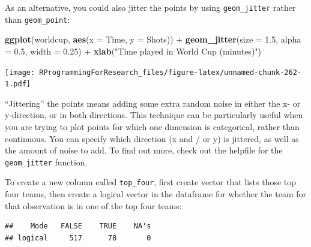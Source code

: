 \documentclass[]{book}
\makeatletter
\newenvironment{Shaded}{\begin{snugshade}}{\end{snugshade}}
\newcommand{\KeywordTok}[1]{\textcolor[rgb]{0.13,0.29,0.53}{\textbf{{#1}}}}
\newcommand{\DataTypeTok}[1]{\textcolor[rgb]{0.13,0.29,0.53}{{#1}}}
\newcommand{\FloatTok}[1]{\textcolor[rgb]{0.00,0.00,0.81}{{#1}}}
\newcommand{\StringTok}[1]{\textcolor[rgb]{0.31,0.60,0.02}{{#1}}}
\newcommand{\NormalTok}[1]{{#1}}
\newenvironment{kframe}{%
\medskip{}
\setlength{\fboxsep}{.8em}
 \def\at@end@of@kframe{}%
 \ifinner\ifhmode%
  \def\at@end@of@kframe{\end{minipage}}%
  \begin{minipage}{\columnwidth}%
 \fi\fi%
 \def\FrameCommand##1{\hskip\@totalleftmargin \hskip-\fboxsep
 \colorbox{shadecolor}{##1}\hskip-\fboxsep
     \hskip-\linewidth \hskip-\@totalleftmargin \hskip\columnwidth}%
 \MakeFramed {\advance\hsize-\width
   \@totalleftmargin\z@ \linewidth\hsize
   \@setminipage}}%
 {\par\unskip\endMakeFramed%
 \at@end@of@kframe}
\renewenvironment{Shaded}{\begin{kframe}}{\end{kframe}}
\newenvironment{rmdblock}[1]
  {
  \begin{itemize}
  \renewcommand{\labelitemi}{
    \raisebox{-.7\height}[0pt][0pt]{
      {\setkeys{Gin}{width=3em,keepaspectratio}\texttt{[image: images/\#1]}}
    }
  }
  \setlength{\fboxsep}{1em}
  \begin{kframe}
  \item
  }
  {
  \end{kframe}
  \end{itemize}
  }
\newenvironment{rmdnote}
  {\begin{rmdblock}{note}}
  {\end{rmdblock}}
\makeatother
\begin{document}
As an alternative, you could also jitter the points by using
\texttt{geom\_jitter} rather than \texttt{geom\_point}:

\begin{Shaded}
\begin{Highlighting}[]
\KeywordTok{ggplot}\NormalTok{(worldcup, }\KeywordTok{aes}\NormalTok{(}\DataTypeTok{x =} \NormalTok{Time, }\DataTypeTok{y =} \NormalTok{Shots)) +}
\StringTok{        }\KeywordTok{geom_jitter}\NormalTok{(}\DataTypeTok{size =} \FloatTok{1.5}\NormalTok{, }\DataTypeTok{alpha =} \FloatTok{0.5}\NormalTok{, }\DataTypeTok{width =} \FloatTok{0.25}\NormalTok{)  +}\StringTok{ }
\StringTok{        }\KeywordTok{xlab}\NormalTok{(}\StringTok{"Time played in World Cup (minutes)"}\NormalTok{)}
\end{Highlighting}
\end{Shaded}

\texttt{[image: RProgrammingForResearch\_files/figure-latex/unnamed-chunk-262-1.pdf]}

\begin{rmdnote}
``Jittering'' the points means adding some extra random noise in either
the x- or y-direction, or in both directions. This technique can be
particularly useful when you are trying to plot points for which one
dimension is categorical, rather than continuous. You can specify which
direction (x and / or y) is jittered, as well as the amount of noise to
add. To find out more, check out the helpfile for the
\texttt{geom\_jitter} function.
\end{rmdnote}

To create a new column called \texttt{top\_four}, first create vector
that lists those top four teams, then create a logical vector in the
dataframe for whether the team for that observation is in one of the top
four teams:

\begin{Shaded}
\end{Shaded}

\begin{verbatim}
##    Mode   FALSE    TRUE    NA's 
## logical     517      78       0
\end{verbatim}
\end{document}
